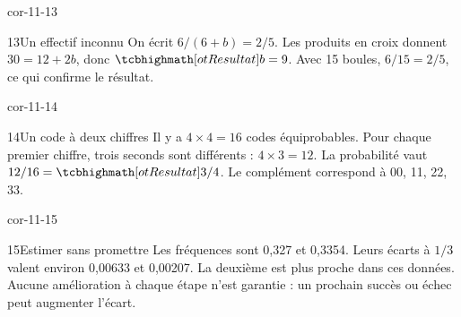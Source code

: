 \begin{blocLivre}{cor-11-13}\begin{corrige}{13}{Un effectif inconnu}
On écrit $6/(6+b)=2/5$. Les produits en croix donnent $30=12+2b$, donc $\res{b=9}$. Avec 15 boules, $6/15=2/5$, ce qui confirme le résultat.
\end{corrige}\end{blocLivre}
\begin{blocLivre}{cor-11-14}\begin{corrige}{14}{Un code à deux chiffres}
Il y a $4\times4=16$ codes équiprobables. Pour chaque premier chiffre, trois seconds sont différents : $4\times3=12$. La probabilité vaut $12/16=\res{3/4}$. Le complément correspond à 00, 11, 22, 33.
\end{corrige}\end{blocLivre}
\begin{blocLivre}{cor-11-15}\begin{corrige}{15}{Estimer sans promettre}
Les fréquences sont 0,327 et 0,3354. Leurs écarts à $1/3$ valent environ 0,00633 et 0,00207. La deuxième est plus proche dans ces données. Aucune amélioration à chaque étape n’est garantie : un prochain succès ou échec peut augmenter l’écart.
\end{corrige}\end{blocLivre}
